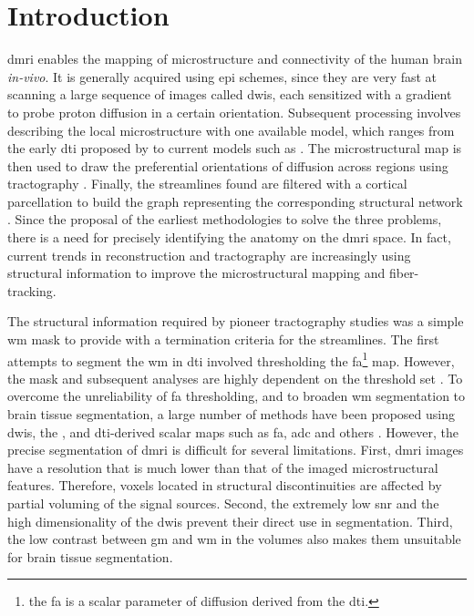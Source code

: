 \section{Introduction}\label{sec:introduction}
\Gls*{dmri} enables the mapping of microstructure \citep{basser_microstructural_1996}
  and connectivity \citep{craddock_imaging_2013} of the human brain \emph{in-vivo}.
It is generally acquired using \gls*{epi} schemes, since they are very fast at
  scanning a large sequence of images called \glspl*{dwi}, each sensitized with
  a gradient to probe proton diffusion in a certain orientation.
Subsequent processing involves describing the local microstructure with one available
  model, which ranges from the early \gls*{dti} proposed by \cite{basser_microstructural_1996}
  to current models such as \citep{daducci_accelerated_2015}.
The microstructural map is then used to draw the preferential orientations of diffusion
  across regions using tractography \citep{mori_threedimensional_1999}.
Finally, the streamlines found are filtered with a cortical parcellation
  to build the graph representing the corresponding structural
  network \citep{hagmann_mapping_2008}.
Since the proposal of the earliest methodologies to solve the three problems,
  there is a need for precisely identifying the anatomy on the \gls*{dmri} space.
In fact, current trends in reconstruction \citep{jeurissen_multitissue_2014} and
  tractography \citep{smith_anatomicallyconstrained_2012} are increasingly using
  structural information to improve the microstructural mapping and fiber-tracking.

The structural information required by pioneer tractography studies was a simple
  \gls*{wm} mask to provide with a termination criteria for the streamlines.
The first attempts to segment the \gls*{wm} in \gls*{dti} involved thresholding the
  \gls*{fa}\footnote{the \gls*{fa} is a scalar parameter of diffusion derived from
  the \gls*{dti}.} map.
However, the mask and subsequent analyses are highly dependent on the threshold set
  \citep{taoka_fractional_2009}.
To overcome the unreliability of \gls*{fa} thresholding, and to broaden
  \gls*{wm} segmentation to brain tissue segmentation, a large number of
  methods have been proposed using \glspl*{dwi}, the \lowb{}, and \gls*{dti}-derived
  scalar maps such as \gls*{fa}, \gls*{adc} and others \citep{zhukov_level_2003,
  rousson_level_2004,jonasson_segmentation_2005,liu_brain_2007,hadjiprocopis_unbiased_2005,
  lu_segmentation_2008,han_experimental_2009}.
However, the precise segmentation of \gls*{dmri} is difficult for several limitations.
First, \gls{dmri} images have a resolution that is much lower than that of the imaged
  microstructural features.
Therefore, voxels located in structural discontinuities are affected by partial
  voluming of the signal sources.
Second, the extremely low \gls*{snr} and the high dimensionality of the \glspl*{dwi} prevent
  their direct use in segmentation.
Third, the low contrast between \gls*{gm} and \gls*{wm} in the \lowb{} volumes also makes
  them unsuitable for brain tissue segmentation.

